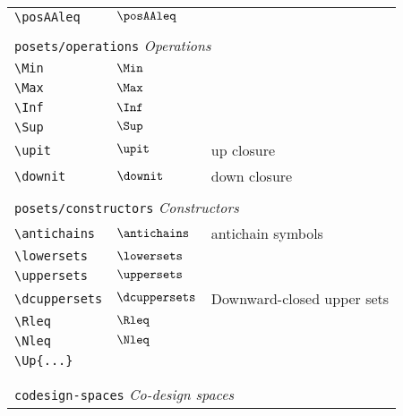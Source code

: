 \begin{longtable}{lll}
 {\color[rgb]{0.5,0.5,0.5}\texttt{\textbackslash posAAleq}} & $\posAAleq$ & \\ 
  &  & \\ 
 \multicolumn{3}{l}{{\color[rgb]{0.5,0.5,0.5}\texttt{posets/operations}} \emph{Operations}}\\ 
 \hline
{\color[rgb]{0.5,0.5,0.5}\texttt{\textbackslash Min}} & $\Min$ & \\ 
 {\color[rgb]{0.5,0.5,0.5}\texttt{\textbackslash Max}} & $\Max$ & \\ 
 {\color[rgb]{0.5,0.5,0.5}\texttt{\textbackslash Inf}} & $\Inf$ & \\ 
 {\color[rgb]{0.5,0.5,0.5}\texttt{\textbackslash Sup}} & $\Sup$ & \\ 
 {\color[rgb]{0.5,0.5,0.5}\texttt{\textbackslash upit}} & $\upit$ &  up closure\\ 
 {\color[rgb]{0.5,0.5,0.5}\texttt{\textbackslash downit}} & $\downit$ &  down closure\\ 
  &  & \\ 
 \multicolumn{3}{l}{{\color[rgb]{0.5,0.5,0.5}\texttt{posets/constructors}} \emph{Constructors}}\\ 
 \hline
{\color[rgb]{0.5,0.5,0.5}\texttt{\textbackslash antichains}} & $\antichains$ &  antichain symbols\\ 
 {\color[rgb]{0.5,0.5,0.5}\texttt{\textbackslash lowersets}} & $\lowersets$ & \\ 
 {\color[rgb]{0.5,0.5,0.5}\texttt{\textbackslash uppersets}} & $\uppersets$ & \\ 
 {\color[rgb]{0.5,0.5,0.5}\texttt{\textbackslash dcuppersets}} & $\dcuppersets$ &  Downward-closed upper sets\\ 
 {\color[rgb]{0.5,0.5,0.5}\texttt{\textbackslash Rleq}} & $\Rleq$ & \\ 
 {\color[rgb]{0.5,0.5,0.5}\texttt{\textbackslash Nleq}} & $\Nleq$ & \\ 
 {\color[rgb]{0.5,0.5,0.5}\texttt{\textbackslash Up\{...\}}} &  & \\ 
  &  & {\setlength\fboxsep{1pt}%
\fbox{%
\color[rgb]{0.5,0.5,0.5}\begin{minipage}[]{5cm}%
$\Up{a}$\par%
{\footnotesize{\texttt{\$\textbackslash Up\{a\}\$}}}\end{minipage}%
}%
}%
\\ 
  &  & \\ 
 \multicolumn{3}{l}{{\color[rgb]{0.5,0.5,0.5}\texttt{codesign-spaces}} \emph{Co-design spaces}}\\ 

\end{longtable}
